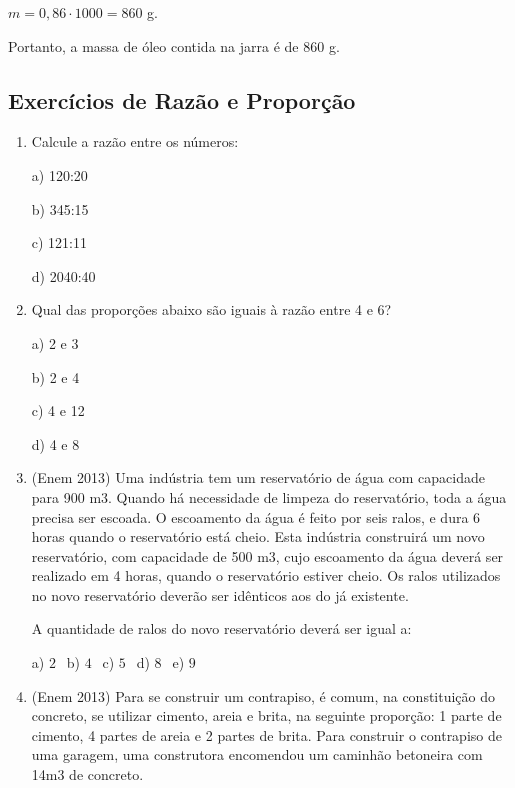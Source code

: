 \begin{multicols*}{2}
\begin{enumerate}
              $ m = 0,86 \cdot 1000 = 860 $ g.

              Portanto, a massa de óleo contida na jarra é de 860 g.

    \end{enumerate}

    \subsection{Exercícios de Razão e Proporção}

    \begin{enumerate}

        \item Calcule a razão entre os números:

              a) 120:20

              b) 345:15

              c) 121:11

              d) 2040:40\\

        \item Qual das proporções abaixo são iguais à razão entre 4 e 6?

              a) 2 e 3

              b) 2 e 4

              c) 4 e 12

              d) 4 e 8\\

        \item (Enem 2013) Uma indústria tem um reservatório de água com capacidade para 900 m3. Quando há necessidade de limpeza do reservatório, toda a água precisa ser escoada. O escoamento da água é feito por seis ralos, e dura 6 horas quando o reservatório está cheio. Esta indústria construirá um novo reservatório, com capacidade de 500 m3, cujo escoamento da água deverá ser realizado em 4 horas, quando o reservatório estiver cheio. Os ralos utilizados no
              novo reservatório deverão ser idênticos aos do já existente.

              A quantidade de ralos do novo reservatório deverá ser igual a:

              a) $2 \ \ $ b) $4 \ \ $ c) $5 \ \ $ d) $8 \ \ $ e) $9 \ \ $

        \item (Enem 2013) Para se construir um contrapiso, é comum, na constituição do concreto, se utilizar cimento, areia e brita, na seguinte proporção: 1 parte de cimento, 4 partes de areia e 2 partes de brita. Para construir o contrapiso de uma
              garagem, uma construtora encomendou um caminhão betoneira com 14m3 de concreto.


\end{enumerate}
\end{multicols*}
